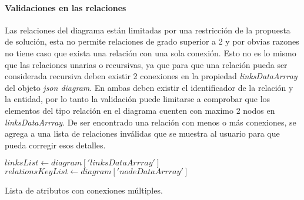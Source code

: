 \paragraph*{Validaciones en las relaciones}

Las relaciones del diagrama están limitadas por una restricción de la propuesta de solución, esta no permite relaciones de grado superior a 2 y por obvias razones no tiene caso que exista una relación con una sola conexión. Esto no es lo mismo que las relaciones unarias o recursivas, ya que para que una relación pueda ser considerada recursiva deben existir 2 conexiones en la propiedad \textit{linksDataArrray} del objeto \textit{json diagram}. En ambas deben existir el identificador de la relación y la entidad, por lo tanto la validación puede limitarse a comprobar que los elementos del tipo relación en el diagrama cuenten con maximo 2 nodos en \textit{linksDataArrray}. De ser encontrado una relación con menos o más conexiones, se agrega a una lista de relaciones inválidas que se muestra al usuario para que pueda corregir esos detalles.

\begin{algorithm}[H]

  $linksList \gets diagram['linksDataArrray']$\\
  $relationsKeyList \gets diagram['nodeDataArrray']$\\

  \caption{Lista de atributos con conexiones múltiples.}
\end{algorithm}